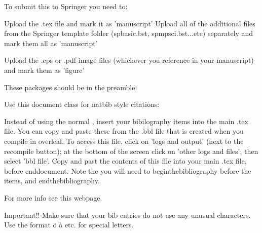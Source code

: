 
To submit this to Springer you need to:

Upload the .tex file and mark it as 'manuscript'
Upload all of the additional files from the Springer template folder (spbasic.bst,                spmpsci.bst...etc) separately and mark them all as 'manuscript'

Upload the .eps or .pdf image files (whichever you reference in your manuscript) and mark them as 'figure'

These packages should be in the preamble:

Use this document class for natbib style citations:

Instead of using the normal , insert your bibilography items into
  the main .tex file. You can copy and paste these from the .bbl file that is created when you
  compile in overleaf. To access this file, click on 'logs and output' (next to the recompile button); at the bottom of the screen click on 'other logs and files'; then select 'bbl file'. Copy and past the contents of this file into your main .tex file, before end{document}.
Note the you will need to begin{thebibliography} before the items, and end{thebibliography}.

For more info see this webpage.

Important!! Make sure that your bib entries do not use any unusual characters. Use the format \"o \`a etc. for special letters.